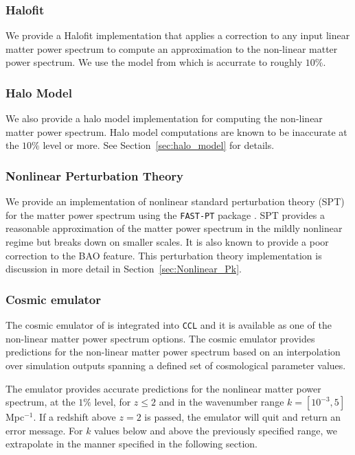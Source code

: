 \documentclass[\docopts]{\docclass}
\newcommand{\ccl}{{\tt CCL}\xspace}
\begin{document}
\subsubsection{Halofit}
We provide a Halofit implementation that applies a correction to any input
linear matter power spectrum to compute an approximation to the non-linear
matter power spectrum. We use the model from \citet{CLASS_halofit} which is
accurrate to roughly $10\%$.

\subsubsection{Halo Model}
We also provide a halo model implementation for computing the non-linear matter
power spectrum. Halo model computations are known to be inaccurate at the $10\%$
level or more. See Section~\ref{sec:halo_model} for details.

\subsubsection{Nonlinear Perturbation Theory}
We provide an implementation of nonlinear standard perturbation theory (SPT) for the matter power spectrum
using the {\tt FAST-PT} package \citep{mcewen16}. SPT provides a reasonable approximation of the matter
power spectrum in the mildly nonlinear regime but breaks down on smaller scales.
It is also known to provide a poor correction to the BAO feature.
This perturbation theory implementation is discussion in more detail in Section~\ref{sec:Nonlinear_Pk}.

\subsubsection{Cosmic emulator}

The cosmic emulator of \citet{Lawrence17} is integrated into \ccl and it is
available as one of the non-linear matter power spectrum options. The cosmic
emulator provides predictions for the non-linear matter power spectrum based on
an interpolation over simulation outputs spanning a defined set of cosmological
parameter values.

The emulator provides accurate predictions for the nonlinear matter power
spectrum, at the $1\%$ level, for $z\leq 2$ and in the wavenumber range
$k=[10^{-3},5]$ Mpc$^{-1}$. If a redshift above $z=2$ is passed, the emulator
will quit and return an error message. For $k$ values below and above the
previously specified range, we extrapolate in the manner specified in the
following section.
\end{document}
